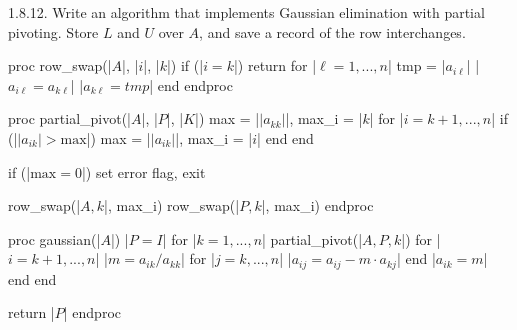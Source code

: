 \documentclass{report}
\begin{document}
    \bigbreak \noindent 
    \begin{mdframed}
        1.8.12. Write an algorithm that implements Gaussian elimination with partial pivoting. Store $L$ and $U$ over $A$, and save a record of the row interchanges. 
    \end{mdframed}
    \bigbreak \noindent 
    \begin{cppcode}
    proc row_swap(|$A$|, |$i$|, |$k$|)
        if (|$i = k$|) return
        for |$\ell = 1,...,n$|
            tmp = |$a_{i\ell}$|  
            |$a_{i\ell} = a_{k\ell}$|
            |$a_{k\ell} = tmp$|
        end
    endproc

    proc partial_pivot(|$A$|, |$P$|, |$K$|)
        max = |$\lvert a_{kk} \rvert $|, max_i = |$k$|
        for |$i=k+1,...,n$|
            if (|$\lvert a_{ik}\rvert > \text{max}$|)
                max = |$\lvert a_{ik} \rvert $|, max_i = |$i$|
            end
        end

        if (|$\text{max} = 0$|) set error flag, exit

        row_swap(|$A,k$|, max_i)
        row_swap(|$P,k$|, max_i)
    endproc

    proc gaussian(|$A$|)
        |$P = I$|
        for |$k=1,...,n$|
            partial_pivot(|$A,P,k$|)
            for |$i=k+1,...,n$|
                |$m = a_{ik} / a_{kk}$|
                for |$j=k,...,n$|
                    |$a_{ij} = a_{ij} - m \cdot a_{kj}$|
                end
                |$a_{ik} = m$|
            end
        end
        
        return |$P$|
    endproc
    \end{cppcode}
\end{document}

